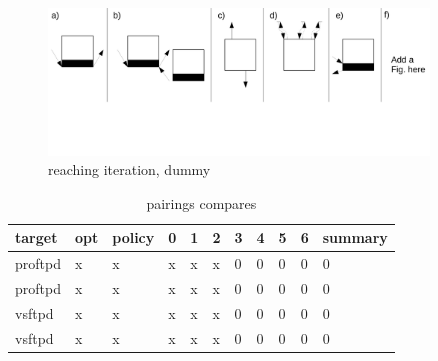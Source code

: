 \begin{figure}[!ht]
  \caption{reaching iteration, dummy}
  \centering
    \includegraphics[width=0.9\textwidth]{figures/reaching_iteration.pdf}
\end{figure}





\begin{table}[H]
\centering
\caption{matching}
\label{matching}
\end{table}

\begin{table}[H]
\centering
\caption{pairings compares}
\label{matching}
\begin{tabular}{|l|l|l|l|l|l|l|l|l|l|l|} \hline
\textbf{target}  & \textbf{opt}     & \textbf{policy} & \textbf{0}    &\textbf{1} & \textbf{2}  & \textbf{3} &\textbf{4} & \textbf{5} &\textbf{6}  &\textbf{summary} \\ \hline 
proftpd          &x                 &x                &x              &x          &x            &0           &0          &0           &0           &0     \\ \hline
proftpd          &x                 &x                &x              &x          &x            &0           &0          &0           &0           &0      \\ \hline
vsftpd           &x                 &x                &x              &x          &x            &0           &0          &0           &0           &0      \\ \hline
vsftpd           &x                 &x                &x              &x          &x            &0           &0          &0           &0           &0      \\ \hline

\end{tabular}
\end{table}

